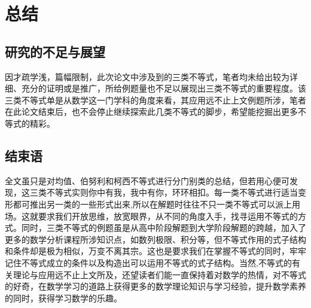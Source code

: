 \chapter{总结}

\section{研究的不足与展望}

因才疏学浅，篇幅限制，此次论文中涉及到的三类不等式，笔者均未给出较为详细、充分的证明或是推广，所给例题量也不足以展现出三类不等式的重要程度。该三类不等式单是从数学这一门学科的角度来看，其应用远不止上文例题所涉，笔者在此论文结束后，也不会停止继续探索此几类不等式的脚步，希望能挖掘出更多不等式的精彩。



\section{结束语}

全文虽只是对均值、伯努利和柯西不等式进行分门别类的总结，但若用心便可发现，这三类不等式实则你中有我，我中有你，环环相扣。每一类不等式进行适当变形都可推出另一类的一些形式出来,所以在解题时往往不只一类不等式可以派上用场。这就要求我们开放思维，放宽眼界，从不同的角度入手，找寻运用不等式的方式。同时，三类不等式的例题虽是从高中阶段解题到大学阶段解题的跨越，加入了更多的数学分析课程所涉知识点，如数列极限、积分等，但不等式作用的式子结构和条件却是极为相似，万变不离其宗。这也是要求我们在掌握不等式的同时，牢牢记住不等式成立的条件以及构造出可以运用不等式的式子结构。当然,不等式的有关理论与应用远不止上文所及，还望读者们能一直保持着对数学的热情，对不等式的好奇，在数学学习的道路上获得更多的数学理论知识与学习经验，提升数学素养的同时，获得学习数学的乐趣。